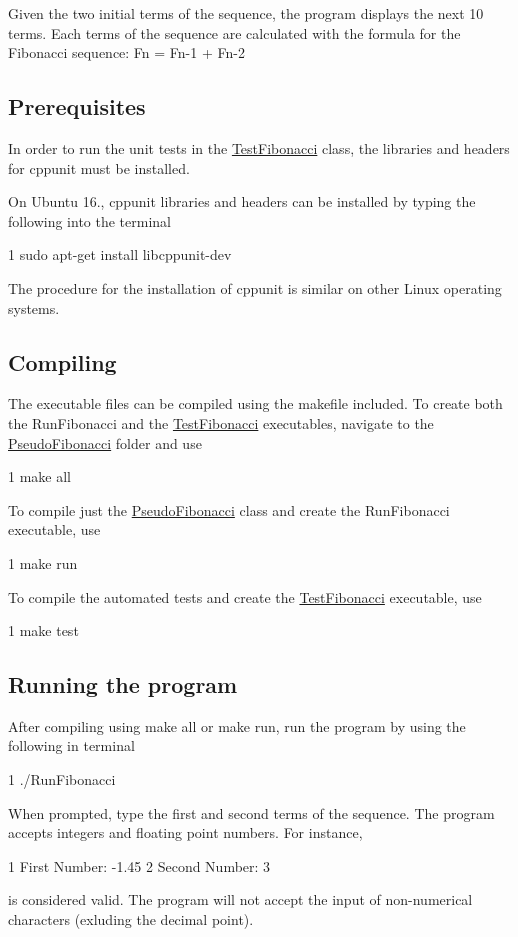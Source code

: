Given the two initial terms of the sequence, the program displays the next 10 terms. Each terms of the sequence are calculated with the formula for the Fibonacci sequence\+: Fn = Fn-\/1 + Fn-\/2

\subsection*{Prerequisites}

In order to run the unit tests in the {\ttfamily \hyperlink{classTestFibonacci}{Test\+Fibonacci}} class, the libraries and headers for cppunit must be installed.

On Ubuntu 16., cppunit libraries and headers can be installed by typing the following into the terminal 
\begin{DoxyCode}
1 sudo apt-get install libcppunit-dev
\end{DoxyCode}
 The procedure for the installation of cppunit is similar on other Linux operating systems.

\subsection*{Compiling}

The executable files can be compiled using the makefile included. To create both the {\ttfamily Run\+Fibonacci} and the {\ttfamily \hyperlink{classTestFibonacci}{Test\+Fibonacci}} executables, navigate to the \hyperlink{classPseudoFibonacci}{Pseudo\+Fibonacci} folder and use


\begin{DoxyCode}
1 make all
\end{DoxyCode}
 To compile just the {\ttfamily \hyperlink{classPseudoFibonacci}{Pseudo\+Fibonacci}} class and create the {\ttfamily Run\+Fibonacci} executable, use 
\begin{DoxyCode}
1 make run
\end{DoxyCode}
 To compile the automated tests and create the {\ttfamily \hyperlink{classTestFibonacci}{Test\+Fibonacci}} executable, use 
\begin{DoxyCode}
1 make test
\end{DoxyCode}
 \subsection*{Running the program}

After compiling using {\ttfamily make all} or {\ttfamily make run}, run the program by using the following in terminal 
\begin{DoxyCode}
1 ./RunFibonacci
\end{DoxyCode}
 When prompted, type the first and second terms of the sequence. The program accepts integers and floating point numbers. For instance, 
\begin{DoxyCode}
1 First Number: -1.45
2 Second Number: 3
\end{DoxyCode}
 is considered valid. The program will not accept the input of non-\/numerical characters (exluding the decimal point).

